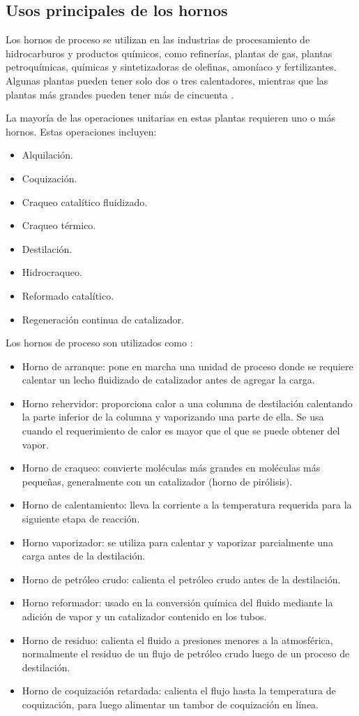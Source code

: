 \subsection{Usos principales de los hornos}
\par Los hornos de proceso se utilizan en las industrias de procesamiento de hidrocarburos y productos químicos, como refinerías, plantas de gas, plantas petroquímicas, químicas y sintetizadoras de olefinas, amoníaco y fertilizantes. Algunas plantas pueden tener solo dos o tres calentadores, mientras que las plantas más grandes pueden tener más de cincuenta \cite{bib:thermox}.
\par La mayoría de las operaciones unitarias en estas plantas requieren uno o más hornos. Estas operaciones incluyen:
\begin{itemize}
    \item Alquilación.
    \item Coquización.
    \item Craqueo catalítico fluidizado.
    \item Craqueo térmico.
    \item Destilación.
    \item Hidrocraqueo.
    \item Reformado catalítico.
    \item Regeneración continua de catalizador.
\end{itemize}
Los hornos de proceso son utilizados como \cite{bib:thermox}:
\begin{itemize}
    \item Horno de arranque: pone en marcha una unidad de proceso donde se requiere calentar un lecho fluidizado de catalizador antes de agregar la carga.
    \item Horno rehervidor: proporciona calor a una columna de destilación calentando la parte inferior de la columna y vaporizando una parte de ella. Se usa cuando el requerimiento de calor es mayor que el que se puede obtener del vapor.
    \item Horno de craqueo: convierte moléculas más grandes en moléculas más pequeñas, generalmente con un catalizador (horno de pirólisis).
    \item Horno de calentamiento: lleva la corriente a la temperatura requerida para la siguiente etapa de reacción.
    \item Horno vaporizador: se utiliza para calentar y vaporizar parcialmente una carga antes de la destilación.
    \item Horno de petróleo crudo: calienta el petróleo crudo antes de la destilación.
    \item Horno reformador: usado en la conversión química del fluido mediante la adición de vapor y un catalizador contenido en los tubos.
    \item Horno de residuo: calienta el fluido a presiones menores a la atmosférica, normalmente el residuo de un flujo de petróleo crudo luego de un proceso de destilación.
    \item Horno de coquización retardada: calienta el flujo hasta la temperatura de coquización, para luego alimentar un tambor de coquización en línea.
\end{itemize}

